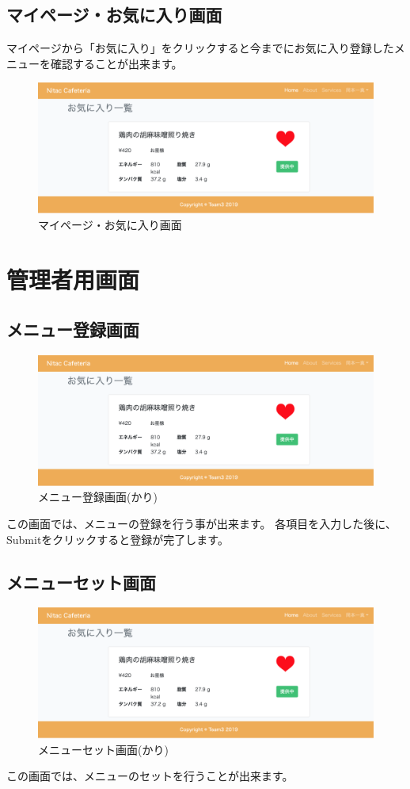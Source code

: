 \documentclass[a4paper]{ltjsarticle}
\begin{document}
    \subsection{マイページ・お気に入り画面}
        マイページから「お気に入り」をクリックすると今までにお気に入り登録したメニューを確認することが出来ます。
        \begin{figure}[htbp]
        \centering
            \caption{マイページ・お気に入り画面}
            \includegraphics[scale = 0.3]{image/myfavorite.png}
        \end{figure}
        \newpage

\section{管理者用画面}
    \subsection{メニュー登録画面}
        \begin{figure}[htbp]
        \centering
            \caption{メニュー登録画面(かり)}
            \includegraphics[scale = 0.3]{image/myfavorite.png}
        \end{figure}
        この画面では、メニューの登録を行う事が出来ます。
        各項目を入力した後に、Submitをクリックすると登録が完了します。

    \subsection{メニューセット画面}
        \begin{figure}[htbp]
        \centering
            \caption{メニューセット画面(かり)}
            \includegraphics[scale = 0.3]{image/myfavorite.png}
        \end{figure}
        この画面では、メニューのセットを行うことが出来ます。
\end{document}
